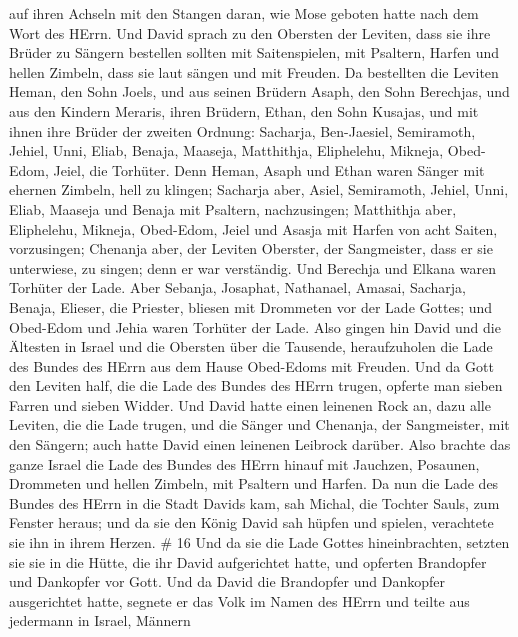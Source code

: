 auf ihren Achseln mit den Stangen daran, wie Mose geboten hatte nach dem
Wort des HErrn.  Und David sprach zu den Obersten der
Leviten, dass sie ihre Brüder zu Sängern bestellen sollten mit
Saitenspielen, mit Psaltern, Harfen und hellen Zimbeln, dass sie laut
sängen und mit Freuden.  Da bestellten die Leviten Heman,
den Sohn Joels, und aus seinen Brüdern Asaph, den Sohn Berechjas, und
aus den Kindern Meraris, ihren Brüdern, Ethan, den Sohn Kusajas,
 und mit ihnen ihre Brüder der zweiten Ordnung: Sacharja,
Ben-Jaesiel, Semiramoth, Jehiel, Unni, Eliab, Benaja, Maaseja,
Matthithja, Eliphelehu, Mikneja, Obed-Edom, Jeiel, die Torhüter.
 Denn Heman, Asaph und Ethan waren Sänger mit ehernen
Zimbeln, hell zu klingen;  Sacharja aber, Asiel,
Semiramoth, Jehiel, Unni, Eliab, Maaseja und Benaja mit Psaltern,
nachzusingen;  Matthithja aber, Eliphelehu, Mikneja,
Obed-Edom, Jeiel und Asasja mit Harfen von acht Saiten, vorzusingen;
 Chenanja aber, der Leviten Oberster, der Sangmeister, dass
er sie unterwiese, zu singen; denn er war verständig.  Und
Berechja und Elkana waren Torhüter der Lade.  Aber Sebanja,
Josaphat, Nathanael, Amasai, Sacharja, Benaja, Elieser, die Priester,
bliesen mit Drommeten vor der Lade Gottes; und Obed-Edom und Jehia waren
Torhüter der Lade.  Also gingen hin David und die Ältesten
in Israel und die Obersten über die Tausende, heraufzuholen die Lade des
Bundes des HErrn aus dem Hause Obed-Edoms mit Freuden.  Und
da Gott den Leviten half, die die Lade des Bundes des HErrn trugen,
opferte man sieben Farren und sieben Widder.  Und David
hatte einen leinenen Rock an, dazu alle Leviten, die die Lade trugen,
und die Sänger und Chenanja, der Sangmeister, mit den Sängern; auch
hatte David einen leinenen Leibrock darüber.  Also brachte
das ganze Israel die Lade des Bundes des HErrn hinauf mit Jauchzen,
Posaunen, Drommeten und hellen Zimbeln, mit Psaltern und Harfen.
 Da nun die Lade des Bundes des HErrn in die Stadt Davids
kam, sah Michal, die Tochter Sauls, zum Fenster heraus; und da sie den
König David sah hüpfen und spielen, verachtete sie ihn in ihrem Herzen.
\# 16  Und da sie die Lade Gottes hineinbrachten, setzten
sie sie in die Hütte, die ihr David aufgerichtet hatte, und opferten
Brandopfer und Dankopfer vor Gott.  Und da David die
Brandopfer und Dankopfer ausgerichtet hatte, segnete er das Volk im
Namen des HErrn  und teilte aus jedermann in Israel, Männern
